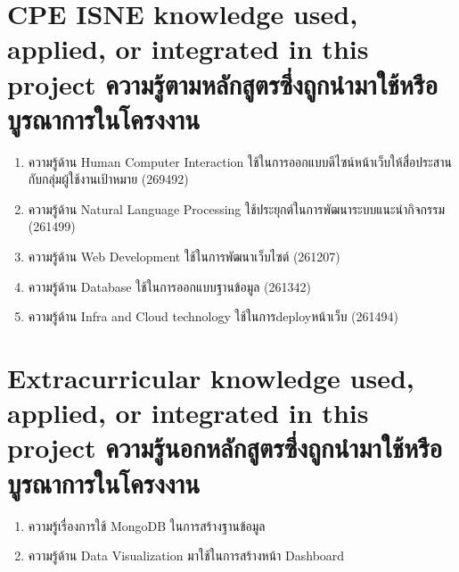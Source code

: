 
\section{\ifenglish%
\ifcpe CPE \else ISNE \fi knowledge used, applied, or integrated in this project
\else%
ความรู้ตามหลักสูตรซึ่งถูกนำมาใช้หรือบูรณาการในโครงงาน
\fi
}
\begin{enumerate}
    \item ความรู้ด้าน Human Computer Interaction ใช้ในการออกแบบดีไซน์หน้าเว็บให้สื่อประสานกับกลุ่มผู้ใช้งานเป้าหมาย (269492)
    \item ความรู้ด้าน Natural Language Processing ใช้ประยุกต์ในการพัฒนาระบบแนะนำกิจกรรม (261499)
    \item ความรู้ด้าน Web Development ใช้ในการพัฒนาเว็บไซต์ (261207)
    \item ความรู้ด้าน Database ใช้ในการออกแบบฐานข้อมูล (261342)
    \item ความรู้ด้าน Infra and Cloud technology ใช้ในการdeployหน้าเว็บ (261494)
\end{enumerate}


\section{\ifenglish%
Extracurricular knowledge used, applied, or integrated in this project
\else%
ความรู้นอกหลักสูตรซึ่งถูกนำมาใช้หรือบูรณาการในโครงงาน
\fi
}
\begin{enumerate}
    \item ความรู้เรื่องการใช้ MongoDB ในการสร้างฐานข้อมูล
    \item ความรู้ด้าน Data Visualization มาใช้ในการสร้างหน้า Dashboard
\end{enumerate}

